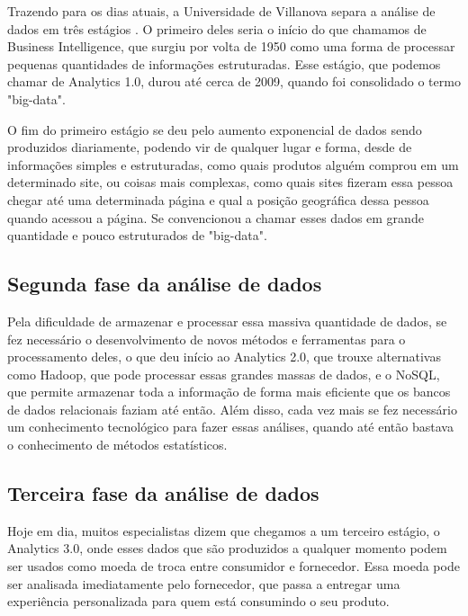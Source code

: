 \indent
\par Trazendo para os dias atuais, a Universidade de Villanova separa a análise de dados em três estágios \cite{Villanova}. O primeiro deles seria o início do que chamamos de Business Intelligence, que surgiu por volta de 1950 como uma forma de processar pequenas quantidades de informações estruturadas. Esse estágio, que podemos chamar de Analytics 1.0, durou até cerca de 2009, quando foi consolidado o termo "big-data".

\par O fim do primeiro estágio se deu pelo aumento exponencial de dados sendo produzidos diariamente, podendo vir de qualquer lugar e forma, desde de informações simples e estruturadas, como quais produtos alguém comprou em um determinado site, ou coisas mais complexas, como quais sites fizeram essa pessoa chegar até uma determinada página e qual a posição geográfica dessa pessoa quando acessou a página. Se convencionou a chamar esses dados em grande quantidade e pouco estruturados de "big-data".

\subsection{Segunda fase da análise de dados}

\indent
\par Pela dificuldade de armazenar e processar essa massiva quantidade de dados, se fez necessário o desenvolvimento de novos métodos e ferramentas para o processamento deles, o que deu início ao Analytics 2.0, que trouxe alternativas como Hadoop, que pode processar essas grandes massas de dados, e o NoSQL, que permite armazenar toda a informação de forma mais eficiente que os bancos de dados relacionais faziam até então. Além disso, cada vez mais se fez necessário um conhecimento tecnológico para fazer essas análises, quando até então bastava o conhecimento de métodos estatísticos.

\subsection{Terceira fase da análise de dados}

\indent
\par Hoje em dia, muitos especialistas dizem que chegamos a um terceiro estágio, o Analytics 3.0, onde esses dados que são produzidos a qualquer momento podem ser usados como moeda de troca entre consumidor e fornecedor. Essa moeda pode ser analisada imediatamente pelo fornecedor, que passa a entregar uma experiência personalizada para quem está consumindo o seu produto.

